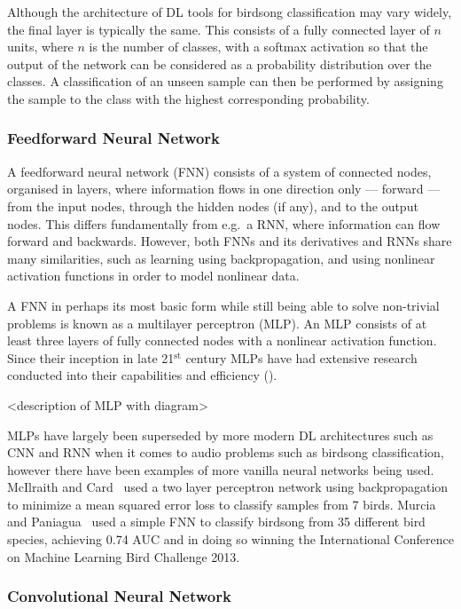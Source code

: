 Although the architecture of DL tools for birdsong classification may vary
widely, the final layer is typically the same. This consists of a fully
connected layer of $n$ units, where $n$ is the number of classes, with a softmax
activation so that the output of the network can be considered as a probability
distribution over the classes. A classification of an unseen sample can then be
performed by assigning the sample to the class with the highest corresponding
probability.

\subsubsection{Feedforward Neural Network}

A feedforward neural network (FNN) consists of a system of connected nodes,
organised in layers, where information flows in one direction only --- forward
--- from the input nodes, through the hidden nodes (if any), and to the output
nodes. This differs fundamentally from e.g.\ a RNN, where information can flow
forward and backwards. However, both FNNs and its derivatives and RNNs share
many similarities, such as learning using backpropagation, and using nonlinear
activation functions in order to model nonlinear data.

A FNN in perhaps its most basic form while still being able to solve non-trivial
problems is known as a multilayer perceptron (MLP). An MLP consists of at least
three layers of fully connected nodes with a nonlinear activation function.
Since their inception in late 21$^{\text{st}}$ century MLPs have had extensive research
conducted into their capabilities and efficiency (\cite{hornik1989multilayer}).

<description of MLP with diagram>

MLPs have largely been superseded by more modern DL architectures such as CNN and
RNN when it comes to audio problems such as birdsong classification, however
there have been examples of more vanilla neural networks being used. McIlraith
and Card~\cite{mcilraith1997birdsong} used a two layer perceptron network using
backpropagation to minimize a mean squared error loss to classify samples from 7
birds. Murcia and Paniagua~\cite{murcia2013bird} used a simple FNN to classify
birdsong from 35 different bird species, achieving 0.74 AUC and in doing so
winning the International Conference on Machine Learning Bird Challenge 2013.

\subsubsection{Convolutional Neural Network}

